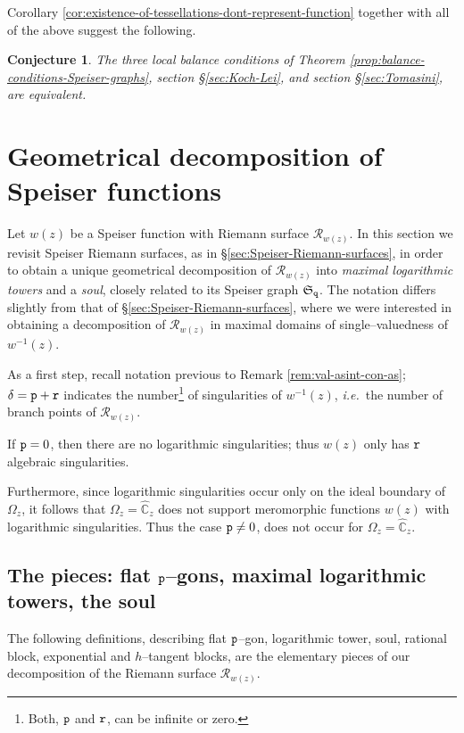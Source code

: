 \documentclass[final,3p,times]{elsarticle}
\newcommand{\CW}{\ensuremath{{\widehat{\mathbb C}}}}
\newcommand{\R}{\ensuremath{{\mathcal R}}}
\newtheorem{conjecture}[theorem]{Conjecture}
\theoremstyle{definition}
\begin{document}
\smallskip
Corollary \ref{cor:existence-of-tessellations-dont-represent-function} together with all of the above suggest the following.


\begin{conjecture}
\label{prop:shape-of-Speiser-function}
The three local balance conditions of 
Theorem \ref{prop:balance-conditions-Speiser-graphs}, section \S\ref{sec:Koch-Lei}, and
section \S\ref{sec:Tomasini}, are equivalent.
\end{conjecture}



\section{Geometrical decomposition of Speiser functions}
\label{sec:Soul-tower-decomposition}
Let $w(z)$ be a Speiser function 
with Riemann surface $\R_{w(z)}$. 
In this section we revisit Speiser Riemann surfaces, 
as in \S\ref{sec:Speiser-Riemann-surfaces}, in order
to obtain a unique geometrical decomposition of $\R_{w(z)}$ into 
\emph{maximal logarithmic towers} and a \emph{soul},
closely related to its Speiser graph $\mathfrak{S}_{\tt q}$.
The notation differs slightly from that of \S\ref{sec:Speiser-Riemann-surfaces},
where we were interested in obtaining a decomposition of $\R_{w(z)}$ in
maximal domains of single--valuedness of $w^{-1}(z)$. 

\noindent
As a first step, recall notation previous to Remark \ref{rem:val-asint-con-as};
$\delta = {\tt p}+{\tt r}$ indicates the number\footnote{
Both, ${\tt p}$ and ${\tt r}$, can be infinite or zero.
} 
of singularities of $w^{-1}(z)$,
\emph{i.e.}\ the number of branch points of $\R_{w(z)}$.

\noindent
If ${\tt p}=0$, then there are no logarithmic singularities; thus $w(z)$ only has $\tt r$
algebraic singularities. 

\noindent
Furthermore, since logarithmic singularities occur only on the ideal boundary of $\Omega_z$,
it follows that $\Omega_z = \CW_z$ does not support meromorphic functions $w(z)$ with logarithmic singularities.
Thus the case ${\tt p}\neq 0$, does not occur for $\Omega_z = \CW_z$.

\subsection{The pieces: flat $\tt p$--gons, maximal logarithmic towers, the soul}
The following definitions, describing 
flat $\tt p$--gon, logarithmic tower, soul, 
rational block, exponential and $h$--tangent blocks,
are the elementary pieces of our decomposition 
of the Riemann surface $\R_{w(z)}$.
\end{document}

